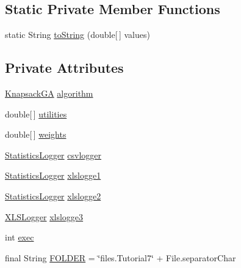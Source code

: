 \subsection*{Static Private Member Functions}
\begin{DoxyCompactItemize}
\item 
static String \hyperlink{classjenes_1_1tutorials_1_1problem7_1_1_knapsack_logged_problem_a330ba8dd04f3b0d010e49a12e0170c8b}{to\-String} (double\mbox{[}$\,$\mbox{]} values)
\end{DoxyCompactItemize}
\subsection*{Private Attributes}
\begin{DoxyCompactItemize}
\item 
\hyperlink{classjenes_1_1tutorials_1_1problem6_1_1_knapsack_g_a}{Knapsack\-G\-A} \hyperlink{classjenes_1_1tutorials_1_1problem7_1_1_knapsack_logged_problem_a20680101f340437075f297dd2e6ac76c}{algorithm}
\item 
double\mbox{[}$\,$\mbox{]} \hyperlink{classjenes_1_1tutorials_1_1problem7_1_1_knapsack_logged_problem_a3c39f1793382e4c16d41caf42a05907d}{utilities}
\item 
double\mbox{[}$\,$\mbox{]} \hyperlink{classjenes_1_1tutorials_1_1problem7_1_1_knapsack_logged_problem_ace6faeb8036c0e4ee84fb3ac1426fdd7}{weights}
\item 
\hyperlink{classjenes_1_1statistics_1_1_statistics_logger}{Statistics\-Logger} \hyperlink{classjenes_1_1tutorials_1_1problem7_1_1_knapsack_logged_problem_a9b30e94eae3713133553dc5f5ec65aa7}{csvlogger}
\item 
\hyperlink{classjenes_1_1statistics_1_1_statistics_logger}{Statistics\-Logger} \hyperlink{classjenes_1_1tutorials_1_1problem7_1_1_knapsack_logged_problem_ab20824ec71dfcefd30888cbbc4c34af6}{xlslogge1}
\item 
\hyperlink{classjenes_1_1statistics_1_1_statistics_logger}{Statistics\-Logger} \hyperlink{classjenes_1_1tutorials_1_1problem7_1_1_knapsack_logged_problem_a7613bfc04d7343ffa607f81747d73d9c}{xlslogge2}
\item 
\hyperlink{classjenes_1_1utils_1_1_x_l_s_logger}{X\-L\-S\-Logger} \hyperlink{classjenes_1_1tutorials_1_1problem7_1_1_knapsack_logged_problem_a3a30daf2350f661a57bd3c176a5b1f2f}{xlslogge3}
\item 
int \hyperlink{classjenes_1_1tutorials_1_1problem7_1_1_knapsack_logged_problem_aaea31db67598677b1f368bb0b2f473b1}{exec}
\item 
final String \hyperlink{classjenes_1_1tutorials_1_1problem7_1_1_knapsack_logged_problem_a88e7c747e1ff2fcf595d36e576223f49}{F\-O\-L\-D\-E\-R} = \char`\"{}files.\-Tutorial7\char`\"{} + File.\-separator\-Char
\end{DoxyCompactItemize}
